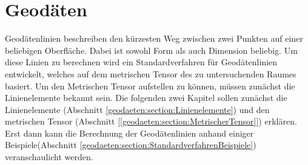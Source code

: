 %
%
%
%
\chapter{Geodäten\label{chapter:geodaeten}}
\begin{refsection}

Geodätenlinien beschreiben den kürzesten Weg zwischen zwei Punkten auf einer beliebigen Oberfläche.
Dabei ist sowohl Form als auch Dimension beliebig.
Um diese Linien zu berechnen wird ein Standardverfahren für Geodätenlinien entwickelt, welches auf dem metrischen Tensor des zu untersuchenden Raumes basiert.
Um den Metrischen Tensor aufstellen zu können, müssen zunächst die Linienelemente bekannt sein.
Die folgenden zwei Kapitel sollen zunächst die Linienelemente (Abschnitt \ref{geodaeten:section:Linienelemente}) und den metrischen Tensor (Abschnitt [\ref{geodaeten:section:MetrischerTensor}]) erklären.
Erst dann kann die Berechnung der Geodätenlinien anhand einiger Beispiele(Abschnitt \ref{geodaeten:section:StandardverfahrenBeispiele}) veranschaulicht werden.





\printbibliography[heading=subbibliography]
\end{refsection}
